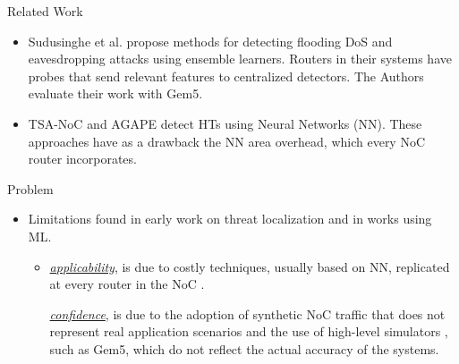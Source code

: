 \begin{frame}{Related Work}
    
    \begin{itemize}
                    
    \item Sudusinghe et al. propose methods for detecting flooding DoS \cite{Sudusinghe:2021:DoS} and eavesdropping attacks \cite{Sudusinghe:2022:Eevesdropping} using ensemble learners. Routers in their systems have probes that send relevant features to centralized detectors. The Authors evaluate their work with Gem5.

    \item TSA-NoC \cite{Wang:2020:TSA-NoC} and AGAPE \cite{Wang:2022:AGAPE} detect HTs using Neural Networks (NN). These approaches have as a drawback the NN area overhead, which every NoC router incorporates.
    
    \end{itemize}
\end{frame}


\begin{frame}{Problem}
    \begin{itemize}

    \item Limitations found in early work on threat localization and in works using ML.

    \begin{itemize}
        \item \ul{\textit{applicability}}, is due to costly techniques, usually based on NN, replicated at every router in the NoC \cite{Rajesh2015, Wang:2020:TSA-NoC, Wang:2022:AGAPE, Sinha:2021:Sniffer}. 

        \ul{\textit{confidence}}, is due to the adoption of synthetic NoC traffic that does not represent real application scenarios \cite{Kulkarni:2016:SVM, Madden:2018:NN, Vashist:2019:WiNoC, Yao:2020:Localization, Hu:2023:Cascaded} and the use of high-level simulators \cite{Sudusinghe:2021:DoS, Sudusinghe:2022:Eevesdropping, Wang:2020:TSA-NoC, Wang:2022:AGAPE, Sinha:2021:Sniffer, Madden:2018:NN, Yao:2020:Localization, Hu:2023:Cascaded}, such as Gem5, which do not reflect the actual accuracy of the systems.
    \end{itemize}
        
    \end{itemize}
\end{frame}

